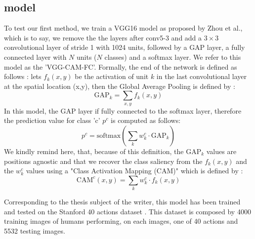 \documentclass[12pt, letterpaper, twoside]{article}
\begin{document}
	\subsection{model} 
	\label{sub:model}
		To test our first method, we train a VGG16 \cite{simonyan2014very} model as proposed by Zhou et al.\cite{zhou2016learning}, which is to say, we remove the the layers after conv5-3 and add a $3\times3$ convolutional layer of stride 1 with 1024 units, followed by a GAP layer, a fully connected layer with $N$ units ($N$ classes) and a softmax layer. We refer to this model as the 'VGG-CAM-FC'.
		Formally, the end of the network is defined as follows : lets $f_k(x,y)$ be the activation of unit $k$ in the last convolutional layer at the spatial location (x,y), then the Global Average Pooling is defined by :
		\begin{equation}
			\textrm{GAP}_k = \sum_{x,y} f_k(x,y)
		\end{equation}
		In this model, the GAP layer if fully connected to the softmax layer, therefore the prediction value for class 'c' ${p^c}$ is computed as follows:
		\begin{equation}
			p^c = \textrm{softmax}\left(\sum_{k} w^c_k \cdot \textrm{GAP}_k\right)
		\end{equation}
		We kindly remind here, that, because of this definition, the $\textrm{GAP}_k$ values are positions agnostic and that we recover the class saliency from the $f_k(x,y)$ and the $w^c_k$ values using a "Class Activation Mapping (CAM)" which is defined by : 
		\begin{equation}
			\textrm{CAM}^c(x,y) = \sum_k w^c_k \cdot f_k(x,y)
			\label{eq:GAP_FC_CAM}
		\end{equation}


		Corresponding to the thesis subject of the writer, this model has been trained and tested on the Stanford 40 actions dataset \cite{yao2011human}. This dataset is composed by 4000 training images of humans performing, on each images, one of 40 actions and 5532 testing images.
	
\end{document}

